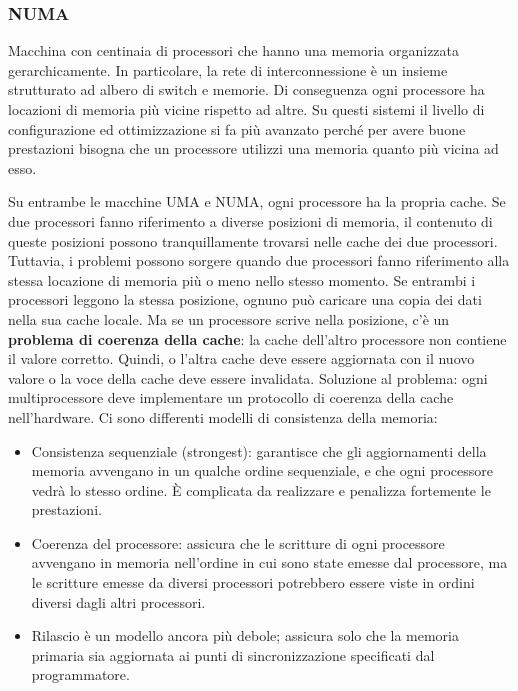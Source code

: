 \documentclass[10pt,a4paper]{book}
\begin{document}
\subsubsection{NUMA} Macchina con centinaia di processori che hanno una memoria organizzata gerarchicamente. In particolare, la rete di interconnessione è un insieme strutturato ad albero di switch e memorie. Di conseguenza ogni processore ha locazioni di memoria più vicine rispetto ad altre. Su questi sistemi il livello di configurazione ed ottimizzazione si fa più avanzato perché per avere buone prestazioni bisogna che un processore utilizzi una memoria quanto più vicina ad esso.

Su entrambe le macchine UMA e NUMA, ogni processore ha la propria cache. Se due processori fanno riferimento a diverse posizioni di memoria, il contenuto di queste posizioni possono tranquillamente trovarsi nelle cache dei due processori. Tuttavia, i problemi possono sorgere quando due processori fanno riferimento alla stessa locazione di memoria più o meno nello stesso momento.
Se entrambi i processori leggono la stessa posizione, ognuno può caricare una copia dei dati nella sua cache locale. Ma se un processore scrive nella posizione, c'è un \textbf{problema di coerenza della cache}: la cache dell'altro processore non contiene il valore corretto. Quindi, o l'altra cache deve essere aggiornata con il nuovo valore o la voce della cache deve essere invalidata. Soluzione al problema: ogni multiprocessore
deve implementare un protocollo di coerenza della cache nell'hardware.
Ci sono differenti modelli di consistenza della memoria:
\begin{itemize}
\item Consistenza sequenziale (strongest): garantisce che gli aggiornamenti della memoria avvengano in un qualche ordine sequenziale, e che ogni processore vedrà lo stesso ordine. \`{E} complicata da realizzare e penalizza fortemente le prestazioni.
\item Coerenza del processore: assicura che le scritture di ogni processore avvengano in memoria
nell'ordine in cui sono state emesse dal processore, ma le scritture emesse da diversi 
processori potrebbero essere viste in ordini diversi dagli altri processori.
\item Rilascio è un modello ancora più debole; assicura solo che la memoria primaria sia aggiornata ai punti di sincronizzazione specificati dal programmatore.
\end{itemize}
\end{document}
